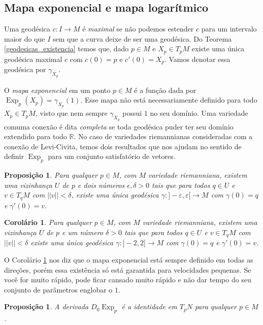 \documentclass{article}
\newtheorem{proposition}[definition]{Proposição}
\newtheorem{corollary}[definition]{Corolário}
\DeclareMathOperator{\Exp}{Exp}
\begin{document}
\subsection{Mapa exponencial e mapa logarítmico}

Uma geodésica $c \colon I \to M$ é \textit{maximal} se não podemos estender $c$ para um intervalo maior do que $I$ sem que a curva deixe de ser uma geodésica. Do Teorema \ref{geodesicas_existencia} temos que, dado $p \in M$ e $X_p \in T_pM$ existe uma única geodésica maximal $c$ com $c(0) = p$ e $c'(0) = X_p$. Vamos denotar essa geodésica por $\gamma_{X_p}$.

O \textit{mapa exponencial} em um ponto $p \in M$ é a função dada por $\Exp_p(X_p) = \gamma_{X_p}(1)$. Esse mapa não está necessariamente definido para todo $X_p \in T_pM$, visto que nem sempre $\gamma_{X_p}$ possui $1$ no seu domínio. Uma variedade comuma conexão é dita \textit{completa} se toda geodésica puder ter seu domínio extendido para todo $\mathbb{R}$. No caso de variedades riemannianas consideradas com a conexão de Levi-Civita, temos dois resultados que nos ajudam no sentido de definir $\Exp_p$ para um conjunto satisfatório de vetores.

\begin{proposition}
    Para qualquer $p \in M$, com $M$ variedade riemanniana, existem uma vizinhança $U$ de $p$ e dois números $\epsilon, \delta > 0$ tais que para todos $q \in U$ e $v \in T_qM$ com $||v|| < \delta$, existe uma única geodésica $\gamma \colon ]-\varepsilon, \varepsilon[ \to M$ com $\gamma(0) = q$ e $\gamma'(0) = v$.
\end{proposition}

\begin{corollary} \label{geodesicas_intervalo}
    Para qualquer $p \in M$, com $M$ variedade riemanniana, existem uma vizinhança $U$ de $p$ e um número $\delta > 0$ tais que para todos $q \in U$ e $v \in T_qM$ com $||v|| < \delta$ existe uma única geodésica $\gamma \colon ]-2, 2[ \to M$ com $\gamma(0) = q$ e $\gamma'(0) = v$.
\end{corollary}

O Corolário \ref{geodesicas_intervalo} nos diz que o mapa exponencial está sempre definido em todas as direções, porém essa existência só está garantida para velocidades pequenas. Se você for muito rápido, pode ficar cansado muito rápido e não dar tempo do seu conjunto de parâmetros englobar o $1$.

\begin{proposition}
    A derivada $D_0\Exp_p$ é a identidade em $T_pN$ para qualquer $p \in M$.
\end{proposition}
\end{document}
